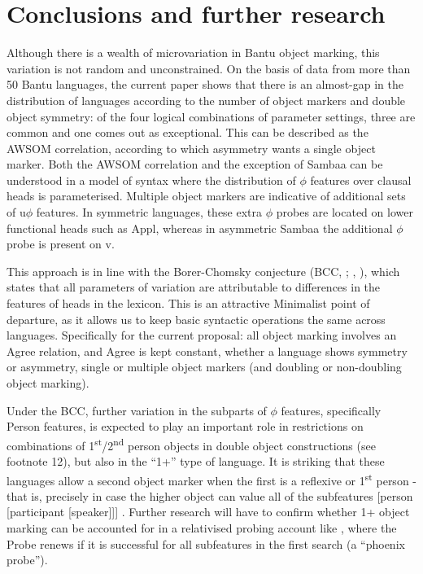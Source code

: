 \documentclass[output=paper
,modfonts
,nonflat]{langsci/langscibook}
\begin{document}
\section{Conclusions and further research}

Although there is a wealth of microvariation in Bantu object marking, this variation is not random and unconstrained. On the basis of data from more than 50 Bantu languages, the current paper shows that there is an almost-gap in the distribution of languages according to the number of object markers and double object symmetry: of the four logical combinations of parameter settings, three are common and one comes out as exceptional. This can be described as the AWSOM correlation, according to which asymmetry wants a single object marker. Both the AWSOM correlation and the exception of Sambaa can be understood in a model of syntax where the distribution of $\phi$ features over clausal heads is parameterised. Multiple object markers are indicative of additional sets of u$\phi$ features. In symmetric languages, these extra $\phi$ probes are located on lower functional heads such as Appl, whereas in asymmetric Sambaa the additional $\phi$ probe is present on v. 

This approach is in line with the Borer-Chomsky conjecture (BCC, \citealt{Baker2008}; \citealt{Borer1984}, \citealt{Chomsky1995}), which states that all parameters of variation are attributable to differences in the features of heads in the lexicon. This is an attractive Minimalist point of departure, as it allows us to keep basic syntactic operations the same across languages. Specifically for the current proposal: all object marking involves an Agree relation, and Agree is kept constant, whether a language shows symmetry or asymmetry, single or multiple object markers (and doubling or non-doubling object marking).

Under the BCC, further variation in the subparts of $\phi$ features, specifically Person features, is expected to play an important role in restrictions on combinations of 1\textsuperscript{st}/2\textsuperscript{nd} person objects in double object constructions (see footnote 12), but also in the “1+” type of language. It is striking that these languages allow a second object marker when the first is a reflexive or 1\textsuperscript{st} person - that is, precisely in case the higher object can value all of the subfeatures [person [participant [speaker]]] \citep{Bejar_Rezac2009}. Further research will have to confirm whether 1+ object marking can be accounted for in a relativised probing account like \citet{Bejar_Rezac2009}, where the Probe renews if it is successful for all subfeatures in the first search (a “phoenix probe”).
\end{document}
